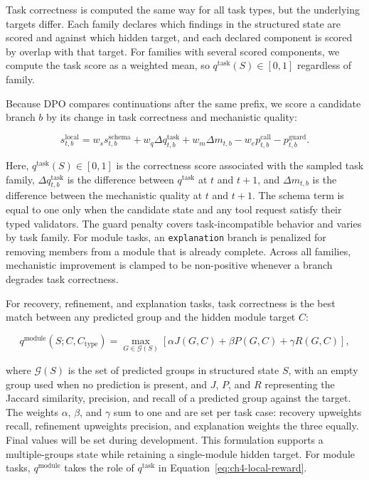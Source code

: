 \documentclass[thesis,letterpaper,12pt]{utthesis}
\begin{document}
Task correctness is computed the same way for all task types, but the underlying targets differ. Each family declares which findings in the structured state are scored and against which hidden target, and each declared component is scored by overlap with that target. For families with several scored components, we compute the task score as a weighted mean, so $q^{\mathrm{task}}(S) \in [0,1]$ regardless of family.

Because DPO compares continuations after the same prefix, we score a candidate branch $b$ by its change in task correctness and mechanistic quality:

\begin{equation}\label{eq:ch4-local-reward}
    s^{\mathrm{local}}_{t,b}
    = w_s s^{\mathrm{schema}}_{t,b}
    + w_q \Delta q^{\mathrm{task}}_{t,b}
    + w_m \Delta m_{t,b}
    - w_e p^{\mathrm{call}}_{t,b}
    - p^{\mathrm{guard}}_{t,b}.
\end{equation}

Here, $q^{\mathrm{task}}(S)\in[0,1]$ is the correctness score associated with the sampled task family, $\Delta q^{\mathrm{task}}_{t,b}$ is the difference between $q^{\mathrm{task}}$ at $t$ and $t+1$, and $\Delta m_{t,b}$ is the difference between the mechanistic quality at $t$ and $t+1$. The schema term is equal to one only when the candidate state and any tool request satisfy their typed validators. The guard penalty covers task-incompatible behavior and varies by task family. For module tasks, an \texttt{explanation} branch is penalized for removing members from a module that is already complete. Across all families, mechanistic improvement is clamped to be non-positive whenever a branch degrades task correctness.

For recovery, refinement, and explanation tasks, task correctness is the best match between any predicted group and the hidden module target $C$:

\begin{equation*}
    q^{\mathrm{module}}(S; C, C_{\mathrm{type}})
    = \max_{G \in \mathcal{G}(S)}
    \left[
        \alpha J(G,C)+\beta P(G,C)+\gamma R(G,C)
    \right],
\end{equation*}

where $\mathcal{G}(S)$ is the set of predicted groups in structured state $S$, with an empty group used when no prediction is present, and $J$, $P$, and $R$ representing the Jaccard similarity, precision, and recall of a predicted group against the target. The weights $\alpha$, $\beta$, and $\gamma$ sum to one and are set per task case: recovery upweights recall, refinement upweights precision, and explanation weights the three equally. Final values will be set during development. This formulation supports a multiple-groups state while retaining a single-module hidden target. For module tasks, $q^{\mathrm{module}}$ takes the role of $q^{\mathrm{task}}$ in Equation~\ref{eq:ch4-local-reward}.
\end{document}

